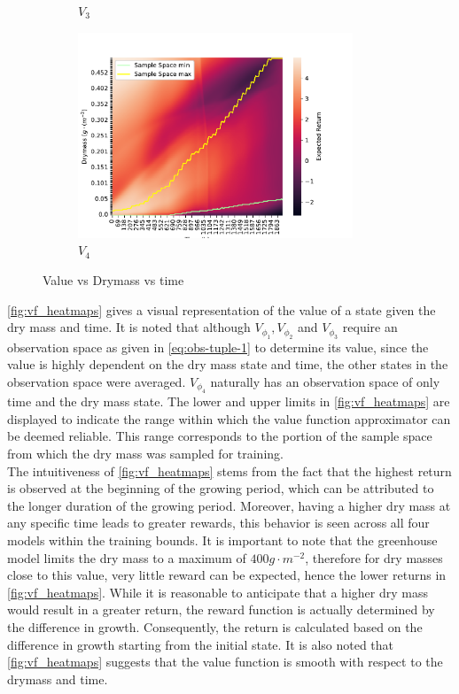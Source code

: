 \begin{figure}[H]
\begin{subfigure}[b]{0.49\textwidth}
		\caption{$V_3$}
		\label{fig:v3_heatmap}
	\end{subfigure}
	\hfill
	\begin{subfigure}[b]{0.49\textwidth}
		\centering
		\includegraphics[width=0.9\textwidth]{figures/deep_reduced_heatmap-eps-converted-to.pdf}
		\caption{$V_4$}
		\label{fig:v4_heatmap}
	\end{subfigure}
	\caption{Value vs Drymass vs time}
	\label{fig:vf_heatmaps}
\end{figure}


\autoref{fig:vf_heatmaps} gives a visual representation of the value of a state given the dry mass and time. It is noted that although $V_{\phi_1},V_{\phi_2}$ and $V_{\phi_3}$ require an observation space as given in \autoref{eq:obs-tuple-1} to determine its value, since the value is highly dependent on the dry mass state and time, the other states in the observation space were averaged. $V_{\phi_4}$ naturally has an observation space of only time and the dry mass state. The lower and upper limits in \autoref{fig:vf_heatmaps} are displayed to indicate the range within which the value function approximator can be deemed reliable. This range corresponds to the portion of the sample space from which the dry mass was sampled for training. \\
The intuitiveness of \autoref{fig:vf_heatmaps} stems from the fact that the highest return is observed at the beginning of the growing period, which can be attributed to the longer duration of the growing period. Moreover,  having a higher dry mass at any specific time leads to greater rewards, this behavior is seen across all four models within the training bounds. It is important to note that the greenhouse model limits the dry mass to a maximum of $400 g \cdot m^{-2}$, therefore for dry masses close to this value, very little reward can be expected, hence the lower returns in \autoref{fig:vf_heatmaps}. While it is reasonable to anticipate that a higher dry mass would result in a greater return, the reward function is actually determined by the difference in growth. Consequently, the return is calculated based on the difference in growth starting from the initial state. It is also noted that \autoref{fig:vf_heatmaps} suggests that the value function is smooth with respect to the drymass and time.


